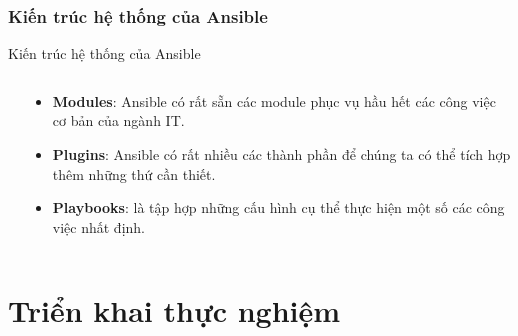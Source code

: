 \documentclass[14pt]{beamer}
\begin{document}
\subsubsection*{Kiến trúc hệ thống của Ansible}
\begin{frame}{Kiến trúc hệ thống của Ansible}
  \setlength{\topsep}{0pt}
  \begin{columns}
    \begin{column}{0.75\textwidth}
      \begin{center}
      \end{center}
    \end{column}
    \hfill
    \pause
    \begin{column}{0.38\textwidth}
      \begin{scriptsize}
        \begin{itemize}
          \item \textbf{Modules}: Ansible có rất sẵn các module phục vụ hầu hết các công việc cơ bản của ngành IT.
          \pause
          \item \textbf{Plugins}: Ansible có rất nhiều các thành phần để chúng ta có thể tích hợp thêm những thứ cần thiết.
          \pause
          \item \textbf{Playbooks}: là tập hợp những cấu hình cụ thể thực hiện một số các công việc nhất định.
        \end{itemize}
      \end{scriptsize}
    \end{column}
  \end{columns}
\end{frame}

\section{Triển khai thực nghiệm}
\end{document}
